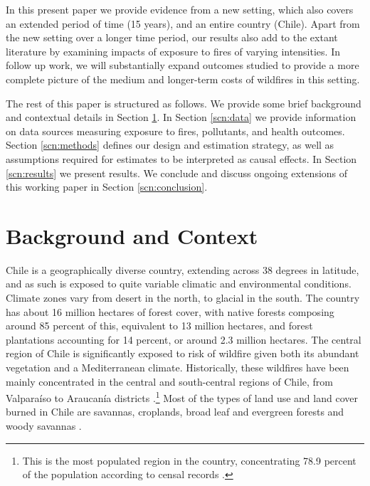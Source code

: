 \documentclass[11pt]{article}
\begin{document}
\begin{spacing}{1.5}
In this present paper we provide evidence from a new setting, which also covers an extended period of time (15 years), and an entire country (Chile).  Apart from the new setting over a longer time period, our results also add to the extant literature by examining impacts of exposure to fires of varying intensities.  In follow up work, we will substantially expand outcomes studied to provide a more complete picture of the medium and longer-term costs of wildfires in this setting.




The rest of this paper is structured as follows. We provide some brief background and contextual details in Section \ref{scn:background}.  In Section \ref{scn:data} we provide information on data sources measuring exposure to fires, pollutants, and health outcomes.  Section \ref{scn:methods} defines our design and estimation strategy, as well as assumptions required for estimates to be interpreted as causal effects.  In Section \ref{scn:results} we present results.  We conclude and discuss ongoing extensions of this working paper in Section \ref{scn:conclusion}.


\section{Background and Context}
\label{scn:background}
Chile is a geographically diverse country, extending across 38 degrees in latitude, and as such is exposed to quite variable climatic and environmental conditions.  Climate zones vary from desert in the north, to glacial in the south. The country has about 16 million hectares of forest cover, with native forests composing around 85 percent of this, equivalent to 13 million hectares, and forest plantations accounting for 14 percent, or around 2.3 million hectares. %
The central region of Chile is significantly exposed to risk of wildfire given both its abundant vegetation and a Mediterranean climate. Historically, these wildfires have been mainly concentrated in the central and south-central regions of Chile, from Valparaíso to Araucanía districts \citep{sarricolea2020recent}.\footnote{This is the most populated region in the country, concentrating 78.9 percent of the population according to censal records \citep{INE2018}.} Most of the types of land use and land cover burned in Chile are savannas, croplands, broad leaf and evergreen forests and woody savannas \citep{sarricolea2020recent}. 


\end{spacing}
\end{document}
